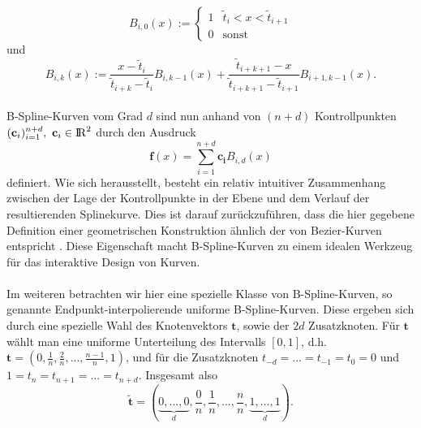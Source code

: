 \documentclass{article}
\newcommand{\R}{{\rm I\!R}}
\begin{document}
\[
B_{i,0}(x) := \begin{cases} 1& \tilde{t}_i<x<\tilde{t}_{i+1} \\ 0& \text{sonst} \end{cases}
\]
und
\[
B_{i,k}(x) := \frac{x-\tilde{t}_i}{\tilde{t}_{i+k}-\tilde{t}_i}B_{i,k-1}(x) + \frac{\tilde{t}_{i+k+1}-x}{\tilde{t}_{i+k+1}-\tilde{t}_{i+1}}B_{i+1,k-1}(x).
\]
\\
%
B-Spline-Kurven vom Grad $d$ sind nun anhand von $(n+d)$ Kontrollpunkten $(\mathbf{c}_i)_{i=1}^{n+d},\ \mathbf{c}_i\in\R^2$ durch den Ausdruck
\[
\mathbf{f}(x)=\sum_{i=1}^{n+d}\mathbf{c_i}B_{i,d}(x)
\]
definiert. Wie sich herausstellt, besteht ein relativ intuitiver Zusammenhang zwischen der Lage der Kontrollpunkte in der Ebene und dem Verlauf der resultierenden Splinekurve. Dies ist darauf zurückzuführen, dass die hier gegebene Definition einer geometrischen Konstruktion ähnlich der von Bezier-Kurven entspricht
. Diese Eigenschaft macht B-Spline-Kurven zu einem idealen Werkzeug für das interaktive Design von Kurven.\\
\\
Im weiteren betrachten wir hier eine spezielle Klasse von B-Spline-Kurven, so genannte Endpunkt-interpolierende uniforme B-Spline-Kurven. Diese ergeben sich durch eine spezielle Wahl des Knotenvektors $\mathbf{t}$, sowie der $2d$ Zusatzknoten. Für $\mathbf{t}$ wählt man eine uniforme Unterteilung des Intervalls $[0,1]$, d.h. $\mathbf{t}=(0,\frac{1}{n},\frac{2}{n},...,\frac{n-1}{n},1)$, und für die Zusatzknoten $t_{-d}=...=t_{-1}=t_0=0$ und $1=t_n=t_{n+1}=...=t_{n+d}$. Insgesamt also
\[
\mathbf{\tilde{t}}=(\underbrace{0,...,0}_{d},\frac{0}{n},\frac{1}{n},...,\frac{n}{n},\underbrace{1,...,1}_{d}).
\]
%
\end{document}
